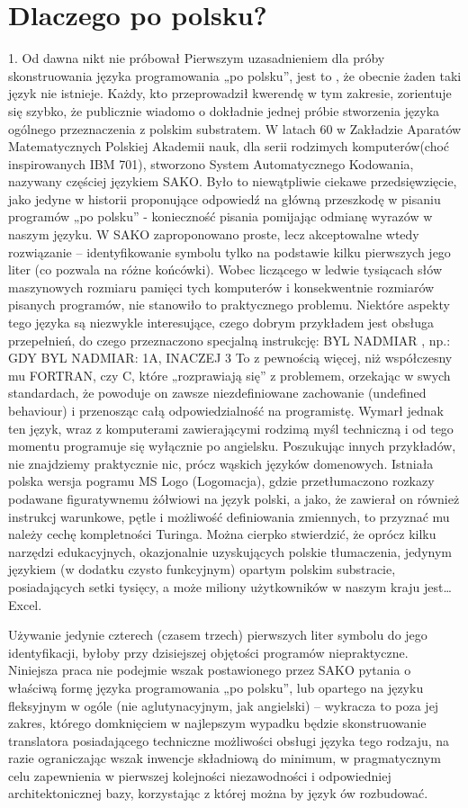 \section{Dlaczego po polsku?}
1. Od dawna nikt nie próbował
Pierwszym uzasadnieniem dla próby skonstruowania języka programowania „po polsku”, jest to , że obecnie żaden taki język nie istnieje. Każdy, kto przeprowadził kwerendę w tym zakresie, zorientuje się szybko, że publicznie wiadomo o dokładnie jednej próbie stworzenia języka ogólnego przeznaczenia z polskim substratem.
W latach 60 w Zakładzie Aparatów Matematycznych Polskiej Akademii nauk, dla serii rodzimych komputerów(choć inspirowanych IBM 701), stworzono System Automatycznego Kodowania, nazywany częściej językiem SAKO. Było to niewątpliwie ciekawe przedsięwzięcie, jako jedyne w historii proponujące odpowiedź na główną przeszkodę w pisaniu programów „po polsku” - konieczność pisania pomijając odmianę wyrazów w naszym języku. W SAKO zaproponowano proste, lecz akceptowalne wtedy rozwiązanie – identyfikowanie symbolu tylko na podstawie kilku pierwszych jego liter (co pozwala na różne końcówki). Wobec liczącego w ledwie tysiącach słów maszynowych rozmiaru pamięci tych komputerów i konsekwentnie rozmiarów pisanych programów, nie stanowiło to praktycznego problemu. 
Niektóre aspekty tego języka są niezwykle interesujące, czego dobrym przykładem jest obsługa przepełnień, do czego przeznaczono specjalną instrukcję:
BYL NADMIAR , np.:
GDY BYL NADMIAR: 1A, INACZEJ 3 
To z pewnością więcej, niż współczesny mu FORTRAN, czy C, które „rozprawiają się” z problemem, orzekając w swych standardach, że powoduje on zawsze niezdefiniowane zachowanie (undefined behaviour) i przenosząc całą odpowiedzialność na programistę.
Wymarł jednak ten język, wraz z komputerami zawierającymi rodzimą myśl techniczną i od tego momentu programuje się wyłącznie po angielsku.
Poszukując innych przykładów, nie znajdziemy praktycznie nic, prócz wąskich języków domenowych. Istniała polska wersja pogramu MS Logo (Logomacja), gdzie przetłumaczono rozkazy podawane figuratywnemu żółwiowi na język polski, a jako, że zawierał on również instrukcj warunkowe, pętle i możliwość definiowania zmiennych, to przyznać mu należy cechę kompletności Turinga. Można cierpko stwierdzić, że oprócz kilku narzędzi edukacyjnych, okazjonalnie uzyskujących polskie tłumaczenia, jedynym językiem (w dodatku czysto funkcyjnym) opartym polskim substracie, posiadających setki tysięcy, a może miliony użytkowników w naszym kraju jest… Excel.

Używanie jedynie czterech (czasem trzech) pierwszych liter symbolu do jego identyfikacji, byłoby przy dzisiejszej objętości programów niepraktyczne. Niniejsza praca nie podejmie wszak postawionego przez SAKO pytania o właściwą formę języka programowania „po polsku”, lub opartego na języku fleksyjnym w ogóle (nie aglutynacyjnym, jak angielski) – wykracza to poza jej zakres, którego domknięciem w najlepszym wypadku będzie skonstruowanie translatora posiadającego techniczne możliwości obsługi języka tego rodzaju, na razie ograniczając wszak inwencje składniową do minimum, w pragmatycznym celu zapewnienia w pierwszej kolejności niezawodności i odpowiedniej architektonicznej bazy, korzystając z której można by język ów rozbudować.

